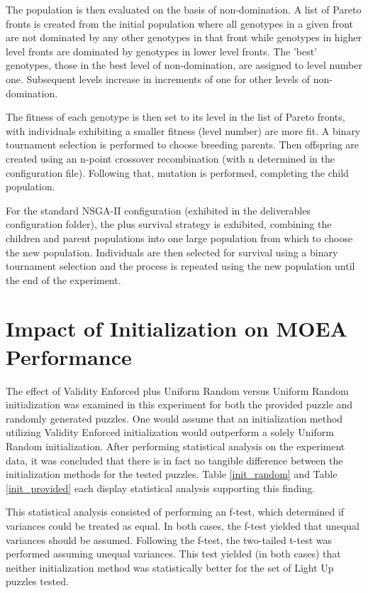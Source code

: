 \documentclass[11pt]{article}
\begin{document}
The population is then evaluated on the basis of non-domination. A list of Pareto fronts is created
from the initial population where all genotypes in a given front are not dominated
by any other genotypes in that front while genotypes in higher level fronts are dominated
by genotypes in lower level fronts. The 'best' genotypes, those in the best level
of non-domination, are assigned to level number one. Subsequent levels increase in
increments of one for other levels of non-domination.

The fitness of each genotype is then set to its level in the list of Pareto fronts, with
individuals exhibiting a smaller fitness (level number) are more fit. A binary tournament selection 
is performed to choose breeding parents. Then offspring are created using an n-point crossover
recombination (with n determined in the configuration file). Following that, mutation is performed,
completing the child population.

For the standard NSGA-II configuration (exhibited in the deliverables configuration folder),
the plus survival strategy is exhibited, combining the children and parent populations into 
one large population from which to choose the new population. Individuals are then selected for 
survival using a binary tournament selection and the process is repeated using the new population
until the end of the experiment.


\section{Impact of Initialization on MOEA Performance}

The effect of Validity Enforced plus Uniform Random versus Uniform Random initialization
was examined in this experiment for both the provided puzzle and randomly generated puzzles.
One would assume that an initialization method utilizing Validity
Enforced initialization would outperform a solely Uniform Random initialization. After performing 
statistical analysis on the experiment data, it was concluded that there is in fact no tangible difference
between the initialization methods for the tested puzzles. Table \ref{init_random} and Table \ref{init_provided} 
each display statistical analysis supporting this finding. 

This statistical analysis consisted of performing an f-test, which determined if variances could be
treated as equal. In both cases, the f-test yielded that unequal variances should be assumed. Following
 the f-test, the two-tailed t-test was performed assuming unequal variances. This test yielded
(in both cases) that neither initialization method was statistically better for the set of Light Up
puzzles tested.
\end{document}
